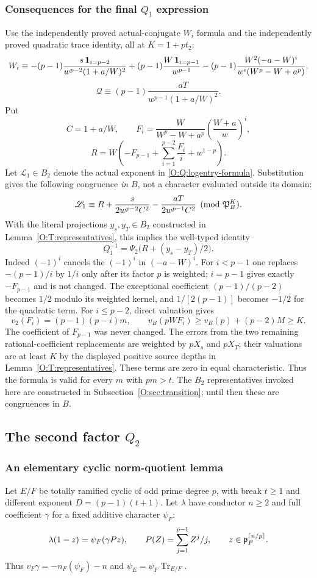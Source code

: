 \documentclass[11pt]{amsart}
\theoremstyle{definition}
\theoremstyle{remark}
\newcommand{\Tr}{\operatorname{Tr}}
\newcommand{\ceil}[1]{\left\lceil #1\right\rceil}
\begin{document}
\subsubsection*{\texorpdfstring{Consequences for the final $Q_1$ expression}{Consequences for the final Q1 expression}}
Use the independently proved actual-conjugate $W_i$ formula and the
independently proved quadratic trace identity, all at $K=1+pt_2$:
\[
 W_i\equiv
 -(p-1)\frac{s\,{\bf1}_{i=p-2}}{w^{p-2}(1+a/W)^2}
 +(p-1)\frac{W\,{\bf1}_{i=p-1}}{w^{p-1}}
 -(p-1)\frac{W^2(-a-W)^i}{w^i(W^p-W+a^p)},
\]
\[
 \mathcal Q\equiv(p-1)\frac{aT}{w^{p-1}(1+a/W)^2}.
\]
Put
\[
 C=1+a/W,\qquad
 F_i=\frac{W}{W^p-W+a^p}\left(\frac{W+a}{w}\right)^i,
\]
\[
 R=W\left(-F_{p-1}+\sum_{i=1}^{p-2}\frac{F_i}{i}+w^{1-p}\right).
\]
Let $\mathscr L_1\in B_2$ denote the actual exponent in
\eqref{O:Q:logentry-formula}. Substitution gives the following congruence
\emph{in $B$}, not a character evaluated outside its domain:
\[
 \mathscr L_1\equiv R+
          \frac{s}{2w^{p-2}C^2}-\frac{aT}{2w^{p-1}C^2}
          \pmod{\mathfrak P_B^K}.
\]
With the literal projections $y_s,y_T\in B_2$ constructed in
Lemma~\ref{O:T:representatives}, this implies the well-typed identity
\[
 Q_1^{-1}=\Psi_2\bigl(R+(y_s-y_T)/2\bigr).
\]
Indeed $(-1)^i$ cancels the $(-1)^i$ in $(-a-W)^i$.
For $i<p-1$ one replaces $-(p-1)/i$ by $1/i$ only after its factor
$p$ is weighted; $i=p-1$ gives exactly $-F_{p-1}$ and is not changed.
The exceptional coefficient $(p-1)/(p-2)$ becomes $1/2$ modulo its
weighted kernel, and $1/[2(p-1)]$ becomes $-1/2$ for the quadratic term.
For $i\le p-2$, direct valuation gives
\[
 v_2(F_i)=(p-1)(p-i)m,\qquad
 v_B(pWF_i)\ge v_B(p)+(p-2)M\ge K.
\]
The coefficient of $F_{p-1}$ was never changed. The errors from the two
remaining rational-coefficient replacements are weighted by $pX_s$ and
$pX_T$; their valuations are at least $K$ by the displayed positive source
depths in Lemma~\ref{O:T:representatives}. These terms are zero in equal
characteristic. Thus the formula is valid for every $m$ with $pm>t$.
The $B_2$ representatives invoked here are constructed in
Subsection~\ref{O:sec:transition}; until then these are congruences in $B$.


\clearpage
\subsection{\texorpdfstring{The second factor $Q_2$}{The second factor Q2}}\label{O:sec:q2}
\subsubsection*{An elementary cyclic norm-quotient lemma}
Let $E/F$ be totally ramified cyclic of odd prime degree $p$, with break
$t\ge1$ and different exponent $D=(p-1)(t+1)$. Let $\lambda$ have conductor
$n\ge2$ and full coefficient $\gamma$ for a fixed additive character
$\psi_F$:
\[
 \lambda(1-z)=\psi_F(\gamma Pz),\qquad
 P(Z)=\sum_{j=1}^{p-1} Z^j/j,\qquad z\in\pp_F^{\ceil{n/p}}.
\]
Thus $v_F\gamma=-n_F(\psi_F)-n$ and
$\psi_E=\psi_F\Tr_{E/F}$.
\end{document}
